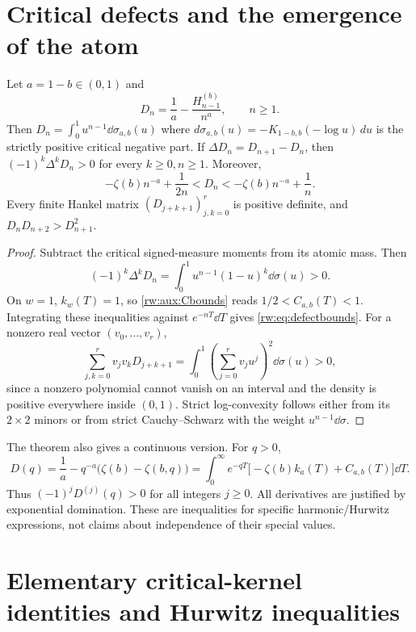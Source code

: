 \section{Critical defects and the emergence of the atom}
\label{rw:sec:defects}

\begin{theorem}\label{rw:thm:defect}
Let $a=1-b\in(0,1)$ and
\[
 D_n=\frac1a-\frac{H_{n-1}^{(b)}}{n^a},\qquad n\ge1.
\]
Then $D_n=\int_0^1u^{n-1}\dd\sigma_{a,b}(u)$ where $d\sigma_{a,b}(u)=-K_{1-b,b}(-\log u)\,du$ is the strictly positive critical negative part. If $\Delta D_n=D_{n+1}-D_n$,
then $(-1)^k\Delta^kD_n>0$ for every $k\ge0,n\ge1$. Moreover,
\begin{equation}\label{rw:eq:defectbounds}
 -\zeta(b)n^{-a}+\frac1{2n}<D_n
 <-\zeta(b)n^{-a}+\frac1n.
\end{equation}
Every finite Hankel matrix $(D_{j+k+1})_{j,k=0}^r$ is positive
definite, and $D_nD_{n+2}>D_{n+1}^2$.
\end{theorem}
\begin{proof}
Subtract the critical signed-measure moments from its atomic mass. Then
\[
 (-1)^k\Delta^kD_n=\int_0^1u^{n-1}(1-u)^k\dd\sigma(u)>0.
\]
On $w=1$, $k_w(T)=1$, so \eqref{rw:aux:Cbounds} reads
$1/2<C_{a,b}(T)<1$. Integrating these inequalities against
$e^{-nT}\dd T$ gives \eqref{rw:eq:defectbounds}.
For a nonzero real vector $(v_0,\ldots,v_r)$,
\[
 \sum_{j,k=0}^rv_jv_kD_{j+k+1}
 =\int_0^1\left(\sum_{j=0}^rv_ju^j\right)^2\dd\sigma(u)>0,
\]
since a nonzero polynomial cannot vanish on an interval and the
density is positive everywhere inside $(0,1)$. Strict log-convexity
follows either from its $2\times2$ minors or from strict
Cauchy--Schwarz with the weight $u^{n-1}\dd\sigma$.
\end{proof}

The theorem also gives a continuous version. For $q>0$,
\begin{equation}\label{rw:eq:continuousdefect}
 D(q)=\frac1a-q^{-a}\bigl(\zeta(b)-\zeta(b,q)\bigr)
 =\int_0^\infty e^{-qT}
   \bigl[-\zeta(b)k_a(T)+C_{a,b}(T)\bigr]\dd T.
\end{equation}
Thus $(-1)^jD^{(j)}(q)>0$ for all integers $j\ge0$.
All derivatives are justified by exponential domination. These are
inequalities for specific harmonic/Hurwitz expressions, not claims
about independence of their special values.

\section{Elementary critical-kernel identities and Hurwitz inequalities}
\label{rw:sec:criticalidentities}

